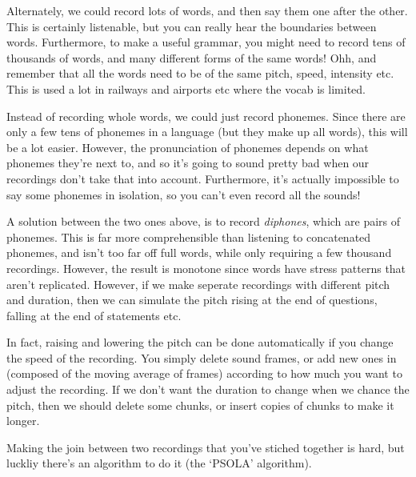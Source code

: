 \begin{description}
  \item Alternately, we could record lots of words, and then say them one after 
  the other. This is certainly listenable, but you can really hear the 
  boundaries between words. Furthermore, to make a useful grammar, you might 
  need to record tens of thousands of words, and many different forms of the 
  same words! Ohh, and remember that all the words need to be of the same pitch, 
  speed, intensity etc. This is used a lot in railways and airports etc where 
  the vocab is limited.

  \item Instead of recording whole words, we could just record phonemes. Since 
  there are only a few tens of phonemes in a language (but they make up all 
  words), this will be a lot easier. However, the pronunciation of phonemes 
  depends on what phonemes they're next to, and so it's going to sound pretty 
  bad when our recordings don't take that into account. Furthermore, it's 
  actually impossible to say some phonemes in isolation, so you can't even 
  record all the sounds!

  \item A solution between the two ones above, is to record \textit{diphones}, 
  which are pairs of phonemes. This is far more comprehensible than listening to 
  concatenated phonemes, and isn't too far off full words, while only requiring 
  a few thousand recordings. However, the result is monotone since words have 
  stress patterns that aren't replicated. However, if we make seperate 
  recordings with different pitch and duration, then we can simulate the pitch 
  rising at the end of questions, falling at the end of statements etc.

  In fact, raising and lowering the pitch can be done automatically if you
  change the speed of the recording. You simply delete sound frames, or add new
  ones in (composed of the moving average of frames) according to how much you
  want to adjust the recording. If we don't want the duration to change when we
  chance the pitch, then we should delete some chunks, or insert copies of
  chunks to make it longer.
\end{description}

Making the join between two recordings that you've stiched together is hard, but luckliy there's an algorithm to do it (the `PSOLA' algorithm).


